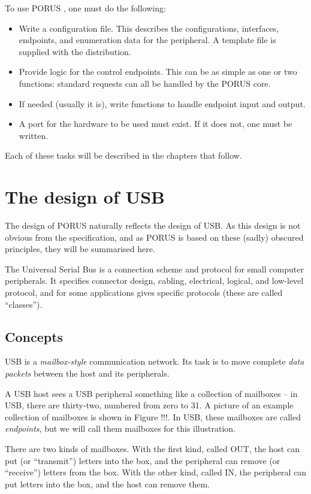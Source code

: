 \documentclass[a4paper]{book}
\newcommand{\porus}{PORUS }
\begin{document}
To use \porus, one must do the following:

\begin{itemize}
\item Write a configuration file.  This describes the configurations, interfaces, endpoints, and enumeration data for the peripheral.  A template file is supplied with the distribution.
\item Provide logic for the control endpoints.  This can be as simple as one or two functions: standard requests can all be handled by the \porus core.
\item If needed (usually it is), write functions to handle endpoint input and output.
\item A port for the hardware to be used must exist.  If it does not, one must be written.
\end{itemize}

Each of these tasks will be described in the chapters that follow.

\section{The design of USB}

The design of \porus naturally reflects the design of USB.  As this design is not obvious from the specification, and as \porus is based on these (sadly) obscured principles, they will be summarised here.

The Universal Serial Bus is a connection scheme and protocol for small computer peripherals.  It specifies connector design, cabling, electrical, logical, and low-level protocol, and for some applications gives specific protocols (these are called ``classes'').

\subsection{Concepts}

USB is a \emph{mailbox-style} communication network.  Its task is to move complete \emph{data packets} between the host and its peripherals.

A USB host sees a USB peripheral something like a collection of mailboxes -- in USB, there are thirty-two, numbered from zero to 31.  A picture of an example collection of mailboxes is shown in Figure !!!.  In USB, these mailboxes are called \emph{endpoints}, but we will call them mailboxes for this illustration.

There are two kinds of mailboxes.  With the first kind, called OUT, the host can put (or ``transmit'') letters into the box, and the peripheral can remove (or ``receive'') letters from the box.  With the other kind, called IN, the peripheral can put letters into the box, and the host can remove them.
\end{document}
